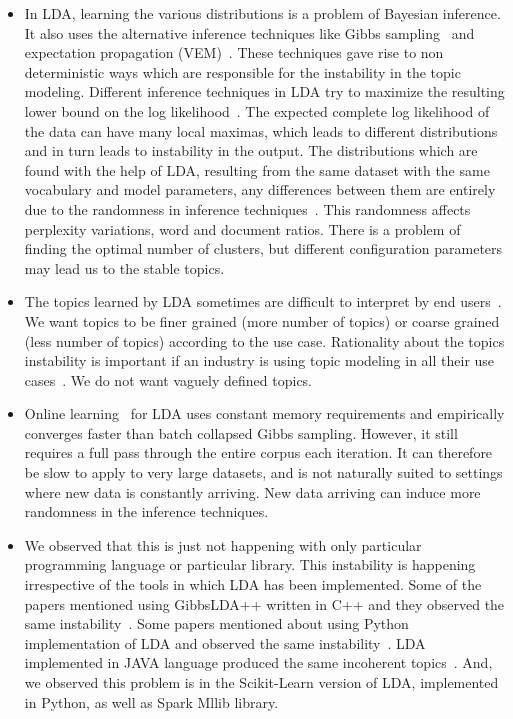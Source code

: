 \documentclass[conference]{IEEEtran}
\theoremstyle{break}
\begin{document}
\begin{itemize}
    \item In LDA, learning the various distributions is a problem of Bayesian inference. It also uses the alternative inference techniques like Gibbs sampling~\cite{wei2006lda, griffiths2004finding} and expectation propagation (VEM)~\cite{minka2002expectation}. These techniques gave rise to non deterministic ways which are responsible for the instability in the topic modeling. Different inference techniques in LDA try to maximize the resulting lower bound on the log likelihood~\cite{blei2003latent}. The expected complete log likelihood of the data can have many local maximas, which leads to different distributions and in turn leads to instability in the output. The distributions which are found with the help of LDA, resulting from the same dataset with the same vocabulary and model parameters, any differences between them are entirely due to the randomness in inference techniques~\cite{koltcov2014latent}. This randomness affects perplexity variations, word and document ratios. There is a problem of finding the optimal number of clusters, but different configuration parameters may lead us to the stable topics.
    \item The topics learned by LDA sometimes are difficult to interpret by end users~\cite{yang2015improving, panichella2013effectively}. We want topics to be finer grained (more number of topics) or coarse grained (less number of topics) according to the use case. Rationality about the topics instability is important if an industry is using topic modeling in all their use cases~\cite{lau2014machine, o2015analysis}. We do not want vaguely defined topics.
    \item Online learning~\cite{hoffman2010online} for LDA uses constant memory requirements and empirically converges faster than batch collapsed Gibbs sampling. However, it still requires a full pass through the entire corpus each iteration. It can therefore be slow to apply to very large datasets, and is not naturally suited to settings where new data is constantly arriving. New data arriving can induce more randomness in the inference techniques.
    \item We observed that this is just not happening with only particular programming language or particular library. This instability is happening irrespective of the tools in which LDA has been implemented. Some of the papers mentioned using GibbsLDA++ written in C++ and they observed the same instability~\cite{lukins2008source, tian2009using, guzman2014users}. Some papers mentioned about using Python implementation of LDA and observed the same instability~\cite{guzman2014users}. LDA implemented in JAVA language produced the same incoherent topics~\cite{martin2015app, hindle2011automated}. And, we observed this problem is in the Scikit-Learn version of LDA, implemented in Python, as well as Spark Mllib library.
\end{itemize}
\end{document}
